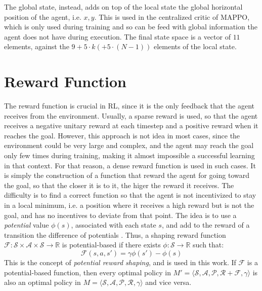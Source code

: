 The global state, instead, adds on top of the local state the global horizontal position of the agent, i.e. $x,y$. This is used in the centralized critic of MAPPO,
which is only used during training and so can be feed with global information the agent does not have during execution. The final state space is a vector of $11$ elements, against 
the $9 + 5\cdot k (+ 5\cdot (N-1))$ elements of the local state. 

\section{Reward Function}

The reward function is crucial in RL, since it is the only feedback that the agent receives from the environment.
Usually, a sparse reward is used, so that the agent receives a negative unitary reward at each timestep and a positive 
reward when it reaches the goal. However, this approach is not idea in most cases, since the environment could be very 
large and complex, and the agent may reach the goal only few times during training, making it almost impossible a 
successful learning in that context. For that reason, a dense reward function is used in such cases. It is simply the 
construction of a function that reward the agent for going toward the goal, so that the closer it is to it, the higer 
the reward it receives. The difficulty is to find a correct function so that the agent is not 
incentivized to stay in a local minimum, i.e. a position where it receives a high reward but is not the goal, and has no
incentives to deviate from that point. The idea is to use a \textit{potential} value $\phi(s)$, associated with each state $s$,
and add to the reward of a transition the difference of potentials \cite{ng1999policy}. Thus, a shaping reward function $\mathcal{F}: \mathcal{S}\times \mathcal{A}\times \mathcal{S} \to \mathbb{R}$ is potential-based if there exists $\phi: \mathcal{S} \to \mathbb{R}$ such that:
\begin{equation}
    \mathcal{F}(s,a,s') = \gamma\phi(s') - \phi(s)
\end{equation}
This is the concept of \textit{potential reward shaping}, and is used in this work. If $\mathcal{F}$ is a potential-based function, then 
every optimal policy in $M' = \langle \mathcal{S},\mathcal{A},\mathcal{P},\mathcal{R} + \mathcal{F},\gamma\rangle$ is also an optimal policy in $M = \langle \mathcal{S},\mathcal{A},\mathcal{P},\mathcal{R},\gamma\rangle$ and vice versa.

